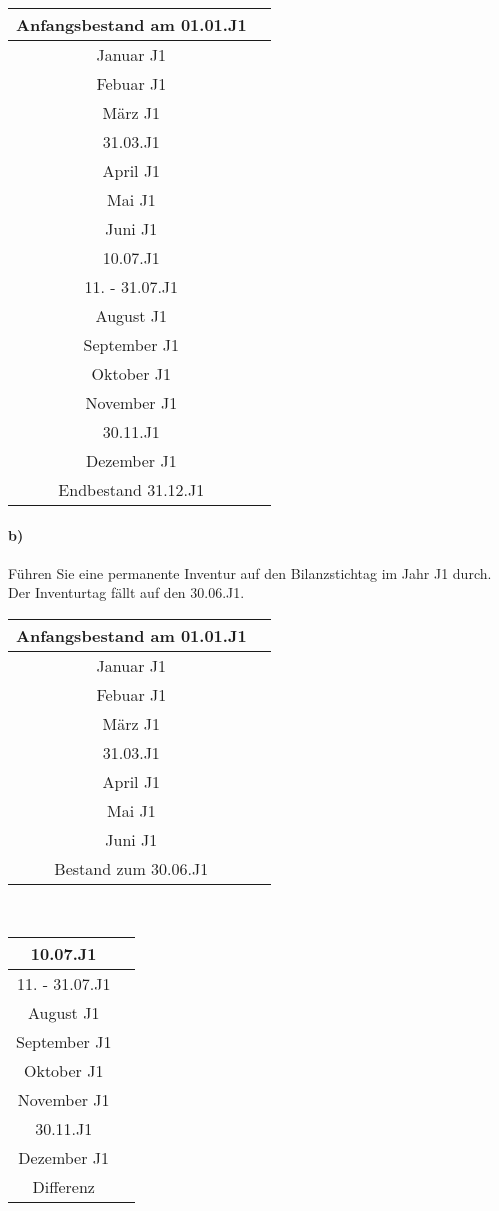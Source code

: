 \documentclass[paper=a4, fontsize=11pt]{scrartcl}
\numberwithin{equation}{section}
\numberwithin{figure}{section}
\numberwithin{table}{section}
\begin{document}
\begin{tabular}{c|c}
\hline
Anfangsbestand am 01.01.J1 & \\
\hline
Januar J1 & \\
\hline
Febuar J1 & \\
\hline 
März J1 & \\
\hline
31.03.J1 & \\
\hline
April J1 & \\
\hline
Mai J1 & \\
\hline
Juni J1 & \\
\hline
10.07.J1 & \\
\hline
11. - 31.07.J1 & \\
\hline
August J1 & \\
\hline
September J1 & \\
\hline
Oktober J1 & \\
\hline
November J1 & \\
\hline
30.11.J1 & \\
\hline
Dezember J1 & \\
\hline
Endbestand 31.12.J1 & \\
\hline
\end{tabular}

\paragraph{b)}

Führen Sie eine permanente Inventur auf den Bilanzstichtag im Jahr J1 durch. Der Inventurtag fällt auf den 30.06.J1. \\

\begin{tabular}{c|c}
\hline
Anfangsbestand am 01.01.J1 & \\
\hline
Januar J1 & \\
\hline
Febuar J1 & \\
\hline 
März J1 & \\
\hline
31.03.J1 & \\
\hline
April J1 & \\
\hline
Mai J1 & \\
\hline
Juni J1 & \\
\hline
Bestand zum 30.06.J1 & \\
\hline
\end{tabular}
\\

\begin{tabular}{c|c}
\hline
10.07.J1 & \\
\hline
11. - 31.07.J1 & \\
\hline
August J1 & \\
\hline
September J1 & \\
\hline
Oktober J1 & \\
\hline
November J1 & \\
\hline
30.11.J1 & \\
\hline
Dezember J1 & \\
\hline
Differenz & \\
\hline
\end{tabular}
\end{document}
